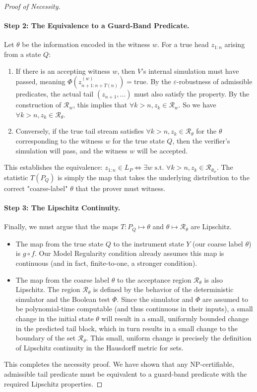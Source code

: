 \documentclass[12pt]{article}
\theoremstyle{definition}
\theoremstyle{plain}
\begin{document}
\begin{proof}[Proof of Necessity]
\paragraph{Step 2: The Equivalence to a Guard-Band Predicate.}
Let $\theta$ be the information encoded in the witness $w$. For a true head $z_{1:n}$ arising from a state $Q$:
\begin{enumerate}
    \item If there is an accepting witness $w$, then $V$'s internal simulation must have passed, meaning $\Phi(\widehat{z}^{(w)}_{n+1:n+T(n)}) = \text{true}$. By the $\varepsilon$-robustness of admissible predicates, the actual tail $(z_{n+1}, \dots)$ must also satisfy the property. By the construction of $\mathcal{R}_w$, this implies that $\forall k > n, z_k \in \mathcal{R}_w$. So we have $\forall k>n, z_k \in \mathcal{R}_\theta$.
    
    \item Conversely, if the true tail stream satisfies $\forall k > n, z_k \in \mathcal{R}_\theta$ for the $\theta$ corresponding to the witness $w$ for the true state $Q$, then the verifier's simulation will pass, and the witness $w$ will be accepted.
\end{enumerate}
This establishes the equivalence: $z_{1:n} \in L_P \iff \exists w \text{ s.t. } \forall k>n, z_k \in \mathcal{R}_{\theta_w}$.
The statistic $T(P_Q)$ is simply the map that takes the underlying distribution to the correct "coarse-label" $\theta$ that the prover must witness.

\paragraph{Step 3: The Lipschitz Continuity.}
Finally, we must argue that the maps $T: P_Q \mapsto \theta$ and $\theta \mapsto \mathcal{R}_\theta$ are Lipschitz.
\begin{itemize}
    \item The map from the true state $Q$ to the instrument state $Y$ (our coarse label $\theta$) is $g \circ f$. Our Model Regularity condition already assumes this map is continuous (and in fact, finite-to-one, a stronger condition).
    \item The map from the coarse label $\theta$ to the acceptance region $\mathcal{R}_\theta$ is also Lipschitz. The region $\mathcal{R}_\theta$ is defined by the behavior of the deterministic simulator and the Boolean test $\Phi$. Since the simulator and $\Phi$ are assumed to be polynomial-time computable (and thus continuous in their inputs), a small change in the initial state $\theta$ will result in a small, uniformly bounded change in the predicted tail block, which in turn results in a small change to the boundary of the set $\mathcal{R}_\theta$. This small, uniform change is precisely the definition of Lipschitz continuity in the Hausdorff metric for sets.
\end{itemize}

This completes the necessity proof. We have shown that any NP-certifiable, admissible tail predicate must be equivalent to a guard-band predicate with the required Lipschitz properties.
\end{proof}
\end{document}
